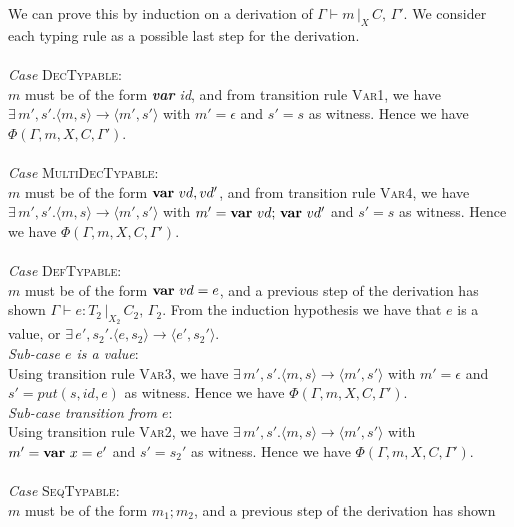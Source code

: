 \documentclass[a4paper, english]{article}
\begin{document}
	We can prove this by induction on a derivation of $\Gamma \vdash m \, |_X\,  C, \, \Gamma'$. We consider each typing rule as a possible last step for the derivation.
\\\\
	\textit{Case} \textsc{DecTypable}:\\
	$m$ must be of the form \textit{\textbf{var} id}, and from transition rule \textsc{Var1}, we have 
	$\exists \, m',s'. \langle m,s\rangle \rightarrow \langle m',s' \rangle$
	with $m'=\epsilon$ and $s'=s$ as witness. Hence we have 
	$\Phi(\Gamma, m, X, C, \Gamma') $.
\\ \\
	\textit{Case} \textsc{MultiDecTypable}:\\
	$m$ must be of the form $\textrm{\textbf{var} }vd, vd'$, and from transition rule \textsc{Var4}, we have 
	$\exists \, m',s'. \langle m,s\rangle \rightarrow \langle m',s' \rangle$
	with $m'= \textrm{\textbf{var} }vd\textrm{; \textbf{var} }vd'$ and $s'=s$ as witness. Hence we have 
	$\Phi(\Gamma, m, X, C, \Gamma') $.
\\ \\
	\textit{Case} \textsc{DefTypable}:\\
	$m$ must be of the form $\textrm{\textbf{var} }vd = e$, and a previous step of the derivation has shown 
	$\Gamma \vdash e : T_2 \, |_X_2\,  C_2, \, \Gamma_2$.
	From the induction hypothesis we have that $e$ is a value, or 
	$\exists \, e',s_2'. \langle e,s_2\rangle \rightarrow \langle e',s_2' \rangle$. \\
	\textit{Sub-case $e$ is a value}: \\
	Using transition rule \textsc{Var3}, we have 
	$\exists \, m',s'. \langle m,s\rangle \rightarrow \langle m',s' \rangle$
	with $m'=\epsilon$ and $s'=put(s,id,e)$ as witness. Hence we have 
	$\Phi(\Gamma, m, X, C, \Gamma') $. \\
	\textit{Sub-case transition from $e$}: \\
	Using transition rule \textsc{Var2}, we have 
	$\exists \, m',s'. \langle m,s\rangle \rightarrow \langle m',s' \rangle$
	with $m'=\textrm{\textbf{var} }x=e'$ and $s'=s_2'$ as witness. Hence we have 
	$\Phi(\Gamma, m, X, C, \Gamma') $.
\\ \\
	\textit{Case} \textsc{SeqTypable}:\\
	$m$ must be of the form \textit{$m_1;m_2$}, and a previous step of the derivation has shown 
\end{document}
